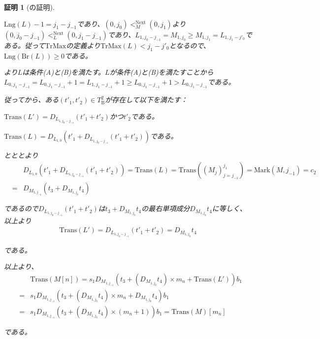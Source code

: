 \documentclass[dvipdfmx,uplatex]{jsarticle}
\theoremstyle{customnonumberbreakfortheorem}
\theoremstyle{customnonumberbreakforproof}
\newtheorem{hideableproof}{証明}
\begin{document}
\begin{hideableproof}[の証明]
\begin{indented}
\begin{indented}
			\item \(\textrm{Lng}(L)-1 = j_1-j_{-1}\)であり、\((0,j_0) <_M^{\textrm{Next}} (0,j_1)\)より\((0,j_0-j_{-1}) <_L^{\textrm{Next}} (0,j_1-j_{-1})\)であり、\(L_{1,j_0-j_{-1}} = M_{1,j_0} \geq M_{1,j_1} = L_{1,j_1-j'_0}\)である。従って\(\textrm{TrMax}\)の定義より\(\textrm{TrMax}(L) < j_1-j'_0\)となるので、\(\textrm{Lng}(\textrm{Br}(L)) \geq 0\)である。
			\item {}より\(L\)は条件(A)と(B)を満たす。\(L\)が条件(A)と(B)を満たすことから\(L_{0,j_1-j_{-1}} = L_{0,j_1-j_{-1}}+1 = L_{1,j_1-j_{-1}}+1 \geq L_{0,j_1-j_{-1}}+1 > L_{0,j_1-j_{-1}}\)である。
			\item 従ってから、ある\((t'_1,t'_2) \in T_{\textrm{B}}^2\)が存在して以下を満たす：
			\begin{penumerate}
				\item \(\textrm{Trans}(L') = D_{L_{1,j_0-j_{-1}}}(t'_1 + t'_2)\)かつ\(t'_2\)である。
				\item \(\textrm{Trans}(L) = D_{L_{1,0}}(t'_1 + D_{L_{1,j_0-j_{-1}}}(t'_1 + t'_2))\)である。
			\end{penumerate}
			\item {}とととより
			\begin{eqnarray*}
			& & D_{L_{1,0}}(t'_1 + D_{L_{1,j_0-j_{-1}}}(t'_1 + t'_2)) = \textrm{Trans}(L) = \textrm{Trans}((M_j)_{j=j_{-1}}^{j_1}) = \textrm{Mark}(M,j_{-1}) = c_2  \\
			& = & D_{M_{1,j_{-1}}}(t_3 + D_{M_{1,j_0}} t_4)
			\end{eqnarray*}
			\item であるので\(D_{L_{1,j_0-j_{-1}}}(t'_1 + t'_2)\)は\(t_3 + D_{M_{1,j_0}} t_4\)の最右単項成分\(D_{M_{1,j_0}} t_4\)に等しく、以上より
			\begin{eqnarray*}
			\textrm{Trans}(L') = D_{L_{1,j_0-j_{-1}}}(t'_1 + t'_2) = D_{M_{1,j_0}} t_4
			\end{eqnarray*}
			\item である。
			\item
			\item 以上より、
			\begin{eqnarray*}
			& & \textrm{Trans}(M[n]) = s_1 D_{M_{1,j_{-1}}}(t_3 + (D_{M_{1,j_0}} t_4) \times m_n + \textrm{Trans}(L')) b_1 \\
			& = & s_1 D_{M_{1,j_{-1}}}(t_3 + (D_{M_{1,j_0}} t_4) \times m_n + D_{M_{1,j_0}} t_4) b_1 \\
			& = & s_1 D_{M_{1,j_{-1}}}(t_3 + (D_{M_{1,j_0}} t_4) \times (m_n+1)) b_1 = \textrm{Trans}(M)[m_n]
			\end{eqnarray*}
			\item である。
		\end{indented}
	\end{indented}
\end{hideableproof}
\end{document}
